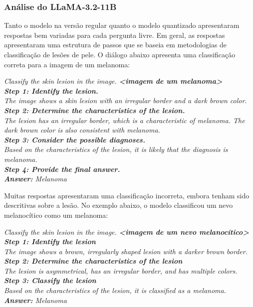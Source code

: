 \subsubsection{Análise do LLaMA-3.2-11B}

Tanto o modelo na versão regular quanto o modelo quantizado apresentaram respostas bem variadas para cada pergunta
livre. Em geral, as respostas apresentaram uma estrutura de passos que se baseia em metodologias de classificação de
lesões de pele. O diálogo abaixo apresenta uma classificação correta para a imagem de um melanoma:

\begin{dialogue}
     \textit{Classify the skin lesion in the image. \textbf{<imagem de um melanoma>}} \\
     \textit{\textbf{Step 1: Identify the lesion.} \\
    The image shows a skin lesion with an irregular border and a dark brown color. \\
    \textbf{Step 2: Determine the characteristics of the lesion.} \\
    The lesion has an irregular border, which is a characteristic of melanoma. The dark brown color is also consistent
    with
    melanoma. \\
    \textbf{Step 3: Consider the possible diagnoses.} \\
    Based on the characteristics of the lesion, it is likely that the diagnosis is melanoma. \\
    \textbf{Step 4: Provide the final answer.} \\
    \textbf{Answer:} Melanoma}
\end{dialogue}

Muitas respostas apresentaram uma classificação incorreta, embora tenham sido descritivas sobre a lesão. No exemplo
abaixo, o modelo classificou um nevo melanocítico como um melanoma:

\begin{dialogue}
     \textit{Classify the skin lesion in the image. \textbf{<imagem de um nevo melanocítico>}} \\
     \textit{\textbf{Step 1: Identify the lesion} \\
    The image shows a brown, irregularly shaped lesion with a darker brown border. \\
    \textbf{Step 2: Determine the characteristics of the lesion} \\
    The lesion is asymmetrical, has an irregular border, and has multiple colors. \\
    \textbf{Step 3: Classify the lesion} \\
    Based on the characteristics of the lesion, it is classified as a melanoma. \\
    \textbf{Answer:} Melanoma}
\end{dialogue}

